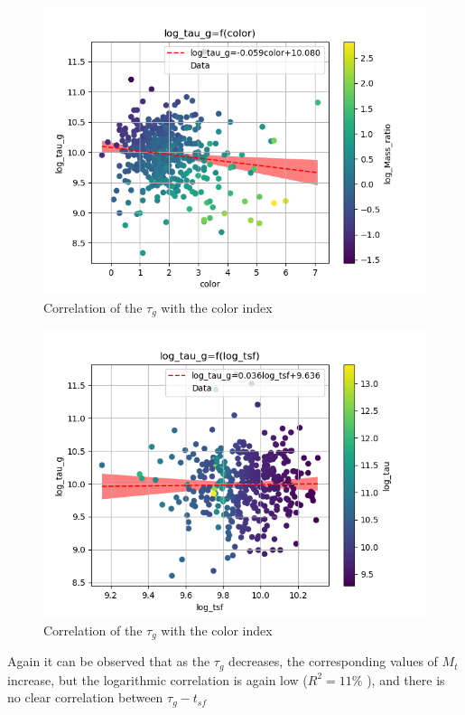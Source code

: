 \documentclass[a4paper,twocolumn]{article}
\begin{document}
\begin{figure}[!htpb]
\centering
\includegraphics[width=.9\linewidth]{./figs/color-log_tau_g-color_log_Mass_ratio.png}
\caption{\label{fig:Correlation of the $\tau_g$ with the color index}Correlation of the \(\tau_g\) with the color index}
\end{figure}

\begin{figure}[!htpb]
\centering
\includegraphics[width=.9\linewidth]{./figs/log_tsf-log_tau_g-color_log_tau.png}
\caption{\label{fig:Correlation of the $\tau_g$ with the color index}Correlation of the \(\tau_g\) with the color index}
\end{figure}


Again it can be observed that as the \(\tau_g\) decreases, the corresponding values of \(M_t\) increase, but the logarithmic correlation is again low (\(R^2 = 11\%\) \noindent), and there is no clear correlation between \(\tau_g-t_{sf}\)
\end{document}
